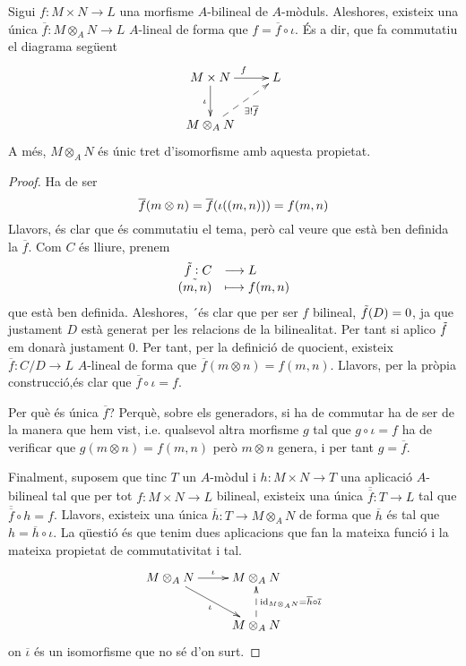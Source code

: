 \documentclass[../../../main.tex]{subfiles}
\begin{document}
\begin{prop}
\label{prop:propietatuniversalproductetensorial} Sigui $f:M\times N\to L$ una morfisme $A$-bilineal de $A$-mòduls. Aleshores, existeix una única $\overline{f}:M\otimes_AN\to L$ $A$-lineal de forma que $f = \overline{f}\circ\iota$. És a dir, que fa commutatiu el diagrama següent
\begin{equation}
    \notag
    \xymatrix{
    M\times N\ar[r]^f\ar[d]_\iota & L \\
    M\otimes_AN\ar@{-->}[ur]_{\exists!\overline{f}} & 
    }
\end{equation}
A més, $M\otimes_AN$ és únic tret d'isomorfisme amb aquesta propietat.
\end{prop}
\begin{proof}
Ha de ser 
\begin{equation}
    \notag
    \overline{f}(m\otimes n) =\overline{f}(\iota((m,n))) = f(m,n)
\end{equation}
Llavors, és clar que és commutatiu el tema, però cal veure que està ben definida la $\overline{f}$. Com $C$ és lliure, prenem 
\begin{equation}
    \notag
    \begin{array}{rl}
        \Tilde{f}:C & \longrightarrow L \\
        \Tilde{(m,n)} & \longmapsto f(m,n)
    \end{array}
\end{equation}
que està ben definida. Aleshores, ´és clar que per ser $f$ bilineal, $\Tilde{f}(D) = 0$, ja que justament $D$ està generat per les relacions de la bilinealitat. Per tant si aplico $\Tilde{f}$ em donarà justament 0. Per tant, per la definició de quocient, existeix $\overline{f}:C/D\to L$ $A$-lineal de forma que $\overline{f}(m\otimes n) = f(m,n)$. Llavors, per la pròpia construcció,és clar que $\overline{f}\circ \iota = f$. 

Per què és única $\overline{f}$? Perquè, sobre els generadors, si ha de commutar ha de ser de la manera que hem vist, i.e. qualsevol altra morfisme $g$ tal que $g\circ\iota = f$ ha de verificar que $g(m\otimes n) = f(m,n)$ però $m\otimes n$ genera, i per tant $g = \overline{f}$.

Finalment, suposem que tinc $T$ un $A$-mòdul i $h:M\times N\to T$ una aplicació $A$-bilineal tal que per tot $f:M\times N\to L$ bilineal, existeix una única $\overline{\overline{f}}:T\to L$ tal que $\overline{\overline{f}}\circ h = f$. Llavors, existeix una única $\overline{h}:T\to M\otimes_AN$ de forma que $\overline{h}$ és tal que $h = \overline{h}\circ \iota$. La qüestió és que tenim dues aplicacions que fan la mateixa funció i la mateixa propietat de commutativitat i tal.
\begin{equation}
    \notag
    \xymatrix{
    M\otimes_AN\ar[r]^\iota\ar[dr]_\iota & M\otimes_AN\\
    & M\otimes_AN\ar@{-->}[u]_{\mathrm{id}_{M\otimes_AN} = \overline{h}\circ\overline{\iota}}
    }
\end{equation}
on $\overline{\iota}$ és un isomorfisme que no sé d'on surt.
\end{proof}
\end{document}
